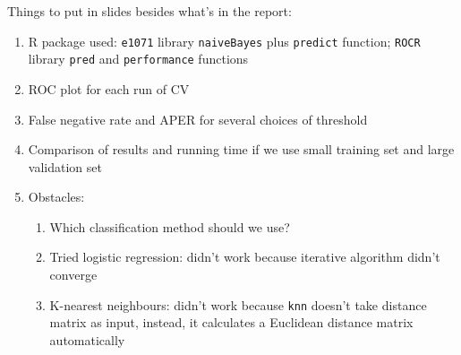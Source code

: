 \documentclass{article}
\begin{document}

Things to put in slides besides what's in the report:
\begin{enumerate}
\item R package used: \texttt{e1071} library \texttt{naiveBayes} plus \texttt{predict} function; \texttt{ROCR} library \texttt{pred} and \texttt{performance} functions
\item ROC plot for each run of CV
\item False negative rate and APER for several choices of threshold
\item Comparison of results and running time if we use small training set and large validation set
\item Obstacles:
\begin{enumerate}
\item Which classification method should we use?
\item Tried logistic regression: didn't work because iterative algorithm didn't converge
\item K-nearest neighbours: didn't work because \texttt{knn} doesn't take distance matrix as input, instead, it calculates a Euclidean distance matrix automatically
\end{enumerate}
\end{enumerate}
\end{document}
